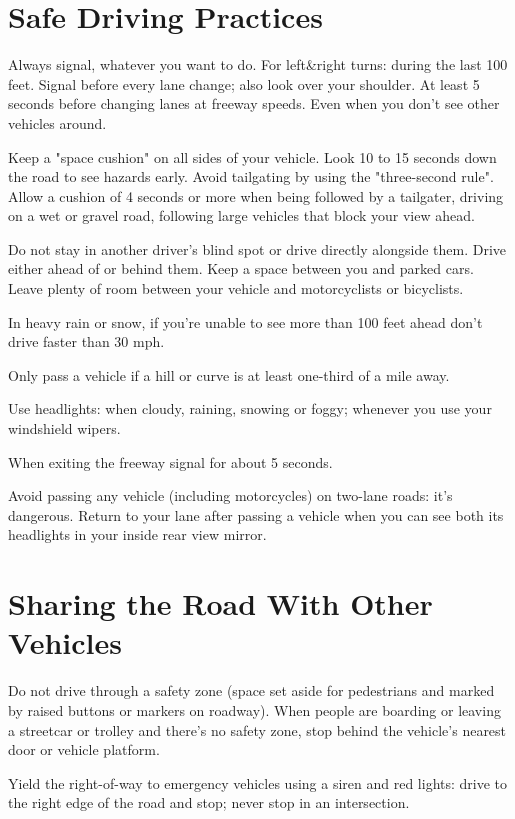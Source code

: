 \section{Safe Driving Practices}

Always signal, whatever you want to do.
For left\&right turns: during the last 100 feet.
Signal before every lane change; also look over your shoulder.
At least 5 seconds before changing lanes at freeway speeds.
Even when you don't see other vehicles around.

Keep a "space cushion" on all sides of your vehicle.
Look 10 to 15 seconds down the road to see hazards early.
Avoid tailgating by using the "three-second rule".
Allow a cushion of 4 seconds or more when being followed by a tailgater,
driving on a wet or gravel road,
following large vehicles that block your view ahead.

Do not stay in another driver's blind spot or drive directly alongside them.
Drive either ahead of or behind them.
Keep a space between you and parked cars.
Leave plenty of room between your vehicle and motorcyclists or bicyclists.

In heavy rain or snow, if you're unable to see more than 100 feet ahead
don't drive faster than 30 mph.

Only pass a vehicle if a hill or curve is at least one-third of a mile away.

Use headlights:
when cloudy, raining, snowing or foggy;
whenever you use your windshield wipers.

When exiting the freeway signal for about 5 seconds.

Avoid passing any vehicle (including motorcycles) on two-lane roads:
it's dangerous.
Return to your lane after passing a vehicle
when you can see both its headlights in your inside rear view mirror.


\section{Sharing the Road With Other Vehicles}

Do not drive through a safety zone (space set aside for pedestrians and
marked by raised buttons or markers on roadway).
When people are boarding or leaving a streetcar or trolley
and there's no safety zone,
stop behind the vehicle's nearest door or vehicle platform.

Yield the right-of-way to emergency vehicles using a siren and red lights:
drive to the right edge of the road and stop; never stop in an intersection.


